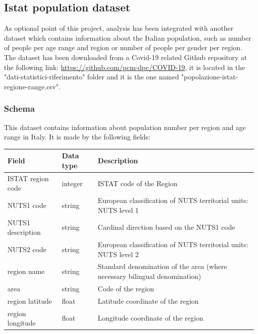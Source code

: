 \documentclass{article}
\begin{document}

\newpage
\subsection{Istat population dataset}
As optional point of this project, analysis has been integrated with another dataset which contains information about the Italian population, such as number of people per age range and region or number of people per gender per region. The dataset has been downloaded from a Covid-19 related Github repository at the following link: \url{https://github.com/pcm-dpc/COVID-19}, it is located in the {\selectfont"dati-statistici-riferimento"} folder and it is the one named {\selectfont"popolazione-istat-regione-range.csv"}.

\subsubsection{Schema}
This dataset contains information about population number per region and age range in Italy. It is made by the following fields:
\hfill\break
\begin{center}
\begin{tabular}{ |m{4cm}|m{2cm}|m{4.5cm}|}
  \hline
  \bfseries{Field} & \bfseries{Data type} & \bfseries{Description} \\
  \hline\hline
  ISTAT region code & integer & ISTAT code of the Region\\
  \hline
  NUTS1 code & string & European classification of NUTS territorial units: NUTS level 1\\
    \hline
      NUTS1 description & string & Cardinal direction based on the NUTS1 code\\
    \hline
          NUTS2 code & string & European classification of NUTS territorial units: NUTS level 2\\
              \hline
                        region name & string & Standard denomination of the area (where necessary bilingual denomination)\\
                        \hline
          area & string & Code of the region\\
                        \hline
          region latitude & float & Latitude coordinate of the region\\
                        \hline
          region longitude & float & Longitude coordinate of the region\\
    \hline

\end{tabular}
\end{center}
\end{document}
